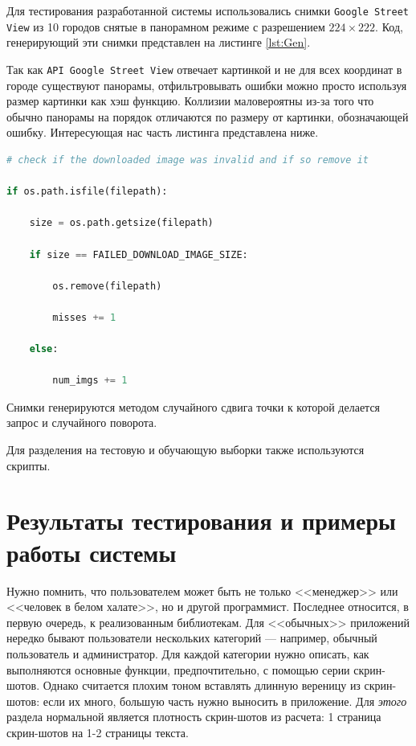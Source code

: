 Для тестирования разработанной системы использовались снимки \texttt{Google Street View} из 10 городов снятые в панорамном режиме с разрешением $ 224\times222 $. Код, генерирующий эти снимки представлен на листинге \ref{lst:Gen}.

Так как \texttt{API Google Street View} отвечает картинкой и не для всех координат в городе существуют панорамы, отфильтровывать ошибки можно просто используя размер картинки
как хэш функцию. Коллизии маловероятны из-за того что обычно панорамы на порядок отличаются по размеру от картинки, обозначающей ошибку. Интересующая нас часть листинга представлена ниже.

\begin{lstlisting}[language=python, float=tb,frame=lines,label=lst:frag1]
# check if the downloaded image was invalid and if so remove it

if os.path.isfile(filepath):

	size = os.path.getsize(filepath)

	if size == FAILED_DOWNLOAD_IMAGE_SIZE:

		os.remove(filepath)

		misses += 1

	else:

		num_imgs += 1

\end{lstlisting}

Снимки генерируются методом случайного сдвига точки к которой делается запрос и случайного поворота.

Для разделения на тестовую и обучающую выборки также используются скрипты.

\section{Результаты тестирования и примеры работы системы}

Нужно помнить, что пользователем может быть не только <<менеджер>> или <<человек в белом халате>>, но и другой программист. Последнее относится, в первую очередь, к реализованным библиотекам. Для <<обычных>> приложений нередко бывают пользователи нескольких категорий --- например, обычный пользователь и администратор. Для каждой категории нужно описать, как выполняются основные функции, предпочтительно, с помощью серии скрин-шотов. Однако считается плохим тоном вставлять длинную вереницу из скрин-шотов: если их много, большую часть нужно выносить в приложение. Для \textit{этого} раздела нормальной является плотность скрин-шотов из расчета: 1 страница скрин-шотов на 1-2 страницы текста.

